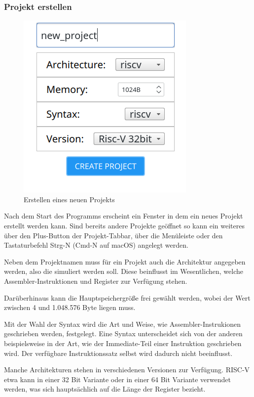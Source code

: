 \subsubsection{Projekt erstellen}
\begin{figure}[ht]
	\centering
  \includegraphics[scale=1]{Images/create_new_project}
	\caption{Erstellen eines neuen Projekts}
	\label{Project_Creation}
\end{figure}

Nach dem Start des Programms erscheint ein Fenster in dem ein neues Projekt erstellt werden kann. Sind bereits andere Projekte geöffnet so kann ein weiteres über den Plus-Button der Projekt-Tabbar, über die Menüleiste oder den Tastaturbefehl Strg-N (Cmd-N auf macOS) angelegt werden.

Neben dem Projektnamen muss für ein Projekt auch die Architektur angegeben werden, also die simuliert werden soll. Diese beinflusst im Wesentlichen, welche Assembler-Instruktionen und Register zur Verfügung stehen.

Darüberhinaus kann die Hauptspeichergröße frei gewählt werden, wobei der Wert zwischen 4 und 1.048.576 Byte liegen muss.

Mit der Wahl der Syntax wird die Art und Weise, wie Assembler-Instrukionen geschrieben werden, festgelegt. Eine Syntax unterscheidet sich von der anderen beispielsweise in der Art, wie der Immediate-Teil einer Instruktion geschrieben wird. Der verfügbare Instruktionssatz selbst wird dadurch nicht beeinflusst.

Manche Architekturen stehen in verschiedenen Versionen zur Verfügung. RISC-V etwa kann in einer 32 Bit Variante oder in einer 64 Bit Variante verwendet werden, was sich hauptsächlich auf die Länge der Register bezieht.


